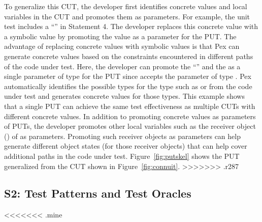 To generalize this CUT, the developer first identifies concrete values and local variables in the CUT and promotes them as parameters. For example, the unit test includes a  ``'' in Statement 4. The developer replaces this concrete value with a symbolic value by promoting the value as a parameter for the PUT. The advantage of replacing concrete values with symbolic values is that Pex can generate concrete values based on the constraints encountered in different paths of the code under test. Here, the developer can promote the  ``'' and the   as a single parameter of type  for the PUT since  accepts the parameter of type . Pex automatically identifies the possible types for the  type such as  or  from the code under test and generates concrete values for those types. This example shows that a single PUT can achieve the same test effectiveness as multiple CUTs with different concrete values. In addition to promoting concrete values as parameters of PUTs, the developer promotes other local variables such as the receiver object () of  as parameters. Promoting such receiver objects as parameters can help generate different object states (for those receiver objects) that can help cover additional paths in the code under test. Figure~\ref{fig:putskel} shows the PUT generalized from the CUT shown in Figure~\ref{fig:connuit}.
>>>>>>> .r287
\subsection{S2: Test Patterns and Test Oracles}

<<<<<<< .mine
